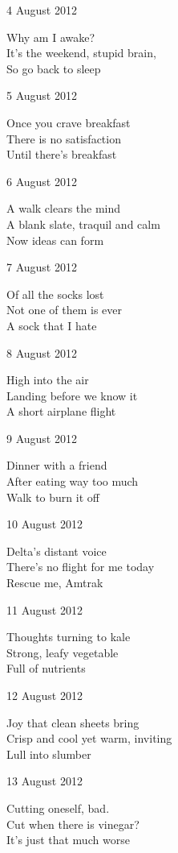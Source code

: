 \documentclass[12pt]{article}
\begin{document}
\newpage

4 August 2012

Why am I awake? \\
It's the weekend, stupid brain, \\
So go back to sleep

5 August 2012

Once you crave breakfast \\
There is no satisfaction \\
Until there's breakfast

6 August 2012

A walk clears the mind \\
A blank slate, traquil and calm \\
Now ideas can form

7 August 2012

Of all the socks lost \\
Not one of them is ever \\
A sock that I hate

8 August 2012

High into the air \\
Landing before we know it \\
A short airplane flight

9 August 2012

Dinner with a friend \\
After eating way too much \\
Walk to burn it off

10 August 2012

Delta's distant voice \\
There's no flight for me today \\
Rescue me, Amtrak

\newpage

11 August 2012

Thoughts turning to kale \\
Strong, leafy vegetable \\
Full of nutrients

12 August 2012

Joy that clean sheets bring \\
Crisp and cool yet warm, inviting \\
Lull into slumber

13 August 2012

Cutting oneself, bad. \\
Cut when there is vinegar? \\
It's just that much worse
\end{document}
